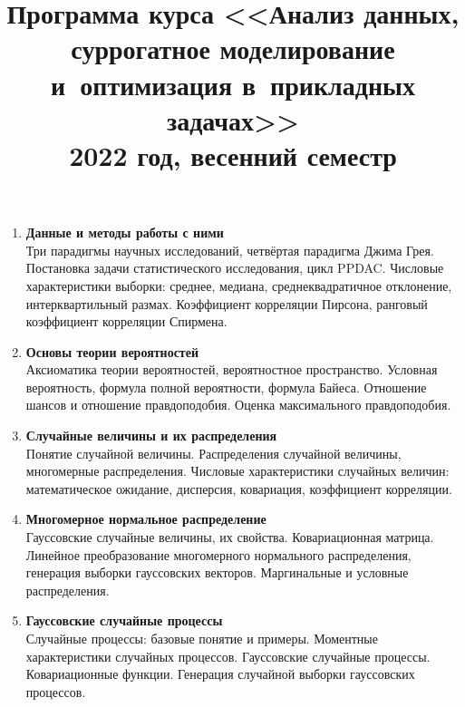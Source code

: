\documentclass[12pt,oneside,openany]{article}
\begin{document}
\title{
  \large
  \textbf{Программа курса <<Анализ данных, суррогатное моделирование и~оптимизация в~прикладных задачах>>} \\
  2022 год, весенний семестр
}

\author{}
\date{}

\maketitle
\thispagestyle{empty}

\vspace{-10ex}


\begin{enumerate}

  \item \textbf{Данные и методы работы с ними} \\
  Три парадигмы научных исследований, четвёртая парадигма Джима Грея. Постановка задачи статистического исследования, цикл PPDAC. Числовые характеристики выборки: среднее, медиана, среднеквадратичное отклонение, интерквартильный размах. Коэффициент корреляции Пирсона, ранговый коэффициент корреляции Спирмена.

  \item \textbf{Основы теории вероятностей} \\
  Аксиоматика теории вероятностей, вероятностное пространство. Условная вероятность, формула полной вероятности, формула Байеса. Отношение шансов и отношение правдоподобия. Оценка максимального правдоподобия.

  \item \textbf{Случайные величины и их распределения} \\
  Понятие случайной величины. Распределения случайной величины, многомерные распределения. Числовые характеристики случайных величин: математическое ожидание, дисперсия, ковариация, коэффициент корреляции.

  \item \textbf{Многомерное нормальное распределение} \\
  Гауссовские случайные величины, их свойства. Ковариационная матрица. Линейное преобразование многомерного нормального распределения, генерация выборки гауссовских векторов. Маргинальные и условные распределения.

  \item \textbf{Гауссовские случайные процессы} \\
  Случайные процессы: базовые понятие и примеры. Моментные характеристики случайных процессов. Гауссовские случайные процессы. Ковариационные функции. Генерация случайной выборки гауссовских процессов.


\end{enumerate}
\end{document}

